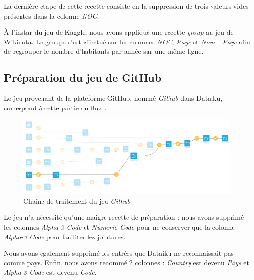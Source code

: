 \documentclass[hidelinks, 12pt]{report}
\begin{document}
La dernière étape de cette recette consiste en la suppression de trois valeurs vides présentes dans la colonne \emph{NOC}.

À l'instar du jeu de Kaggle, nous avons appliqué une recette \emph{group} au jeu de Wikidata. Le groupe s'est effectué sur les colonnes \emph{NOC}, \emph{Pays} et \emph{Nom - Pays} afin de regrouper le nombre d'habitants par année sur une même ligne.





%





\subsection{Préparation du jeu de GitHub}

Le jeu provenant de la plateforme GitHub, nommé \textit{Github} dans Dataiku, correspond à cette partie du flux :

\begin{center}
	\begin{figure}[H]
		\setlength{\belowcaptionskip}{-35pt}
		\includegraphics[scale=0.35]{images/flow-medals-github.png}
		\caption{Chaîne de traitement du jeu \textit{Github}}
	\end{figure}
\end{center}

Le jeu n'a nécessité qu'une maigre recette de préparation : nous avons supprimé les colonnes \textit{Alpha-2 Code} et \textit{Numeric Code} pour ne conserver que la colonne \textit{Alpha-3 Code} pour faciliter les jointures.

Nous avons également supprimé les entrées que Dataiku ne reconnaissait pas comme pays. Enfin, nous avons renommé 2 colonnes : \textit{Country} est devenu \textit{Pays} et \textit{Alpha-3 Code} est devenu \textit{Code}.





%
\end{document}
